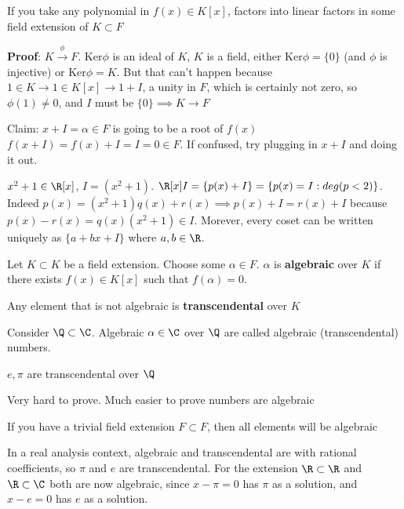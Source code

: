 \documentclass[twoside, 10pt]{article}
\begin{document}
\begin{cor}
    If you take any polynomial in $f(x) \in K[x]$, factors into linear factors in some field extension of $K \subset F$
\end{cor}

\textbf{Proof}: $K \stackrel{\phi}{\to} F$. Ker$\phi$ is an ideal of $K$, $K$ is a field, either Ker$\phi = \{0\}$ (and $\phi$ is injective) or Ker$\phi = K$. But that can't happen because $1 \in K \to 1 \in K[x] \to 1 + I$, a unity in $F$, which is certainly not zero, so $\phi(1) \neq 0$, and $I$ must be $\{0\} \implies K \to F$

Claim: $x + I = \alpha \in F$ is going to be a root of $f(x)$ $f(x + I) = f(x) + I = I = 0 \in F$. If confused, try plugging in $x + I$ and doing it out.

$x^2 + 1 \in \R[x]$, $I = (x^2 + 1)$. $\R[x]I = \{p(x) + I\} = \{p(x) = I : deg(p < 2)\}$. Indeed $p(x) = (x^2 + 1)q(x) + r(x) \implies p(x) + I = r(x) + I$ because $p(x) - r(x) = q(x)(x^2 + 1) \in I$. Morever, every coset can be written uniquely as $\{a + bx + I\}$ where $a, b \in \R$. 

\begin{defn}
    Let $K \subset K$ be a field extension. Choose some $\alpha \in F$. $\alpha$ is \textbf{algebraic} over $K$ if there exists $f(x) \in K[x]$ such that $f(\alpha) = 0$.
\end{defn}

\begin{defn}
    Any element that is not algebraic is \textbf{transcendental} over $K$
\end{defn}

\begin{exm*}
    Consider $\Q \subset \C$. Algebraic $\alpha \in \C$ over $\Q$ are called algebraic (transcendental) numbers.
\end{exm*}

\begin{thm}
    $e, \pi$ are transcendental over $\Q$ 
\end{thm}
Very hard to prove. Much easier to prove numbers are algebraic

\begin{rmk}
    If you have a trivial field extension $F \subset F$, then all elements will be algebraic    
\end{rmk}
In a real analysis context, algebraic and transcendental are with rational coefficients, so $\pi$ and $e$ are transcendental. For the extension $\R \subset \R$ and $\R \subset \C$ both are now algebraic, since $x - \pi = 0$ has $\pi$ as a solution, and $x - e = 0$ has $e$ as a solution.
\end{document}
